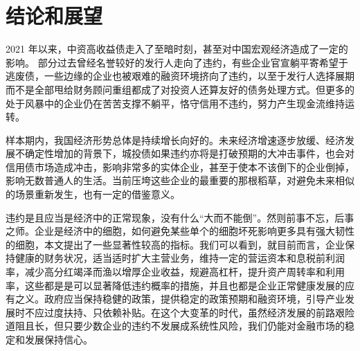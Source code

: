 \chapter{结论和展望}

2021 年以来，中资高收益债走入了至暗时刻，甚至对中国宏观经济造成了一定的影响。
部分过去曾经名誉较好的发行人走向了违约，有些企业官宣躺平寄希望于逃废债，一些边缘的企业也被艰难的融资环境挤向了违约，以至于发行人选择展期而不是全部甩给财务顾问重组都成了对投资人还算友好的债务处理方式。但更多的处于风暴中的企业仍在苦苦支撑不躺平，恪守信用不违约，努力产生现金流维持运转。

样本期内，我国经济形势总体是持续增长向好的。未来经济增速逐步放缓、经济发展不确定性增加的背景下，城投债如果违约亦将是打破预期的大冲击事件，也会对信用债市场造成冲击，影响非常多的实体企业，甚至于使本不该倒下的企业倒掉，影响无数普通人的生活。当前压垮这些企业的最重要的那根稻草，对避免未来相似的场景重新发生，也有一定的借鉴意义。

违约是且应当是经济中的正常现象，没有什么“大而不能倒”。然则前事不忘，后事之师。企业是经济中的细胞，如何避免某些单个的细胞坏死影响更多具有强大韧性的细胞，本文提出了一些显著性较高的指标。我们可以看到，就目前而言，企业保持健康的财务状况，适当适时扩大主营业务，维持一定的营运资本和息税前利润率，减少高分红竭泽而渔以增厚企业收益，规避高杠杆，提升资产周转率和利用率，这些都是是可以显著降低违约概率的措施，并且也都是企业正常健康发展的应有之义。政府应当保持稳健的政策，提供稳定的政策预期和融资环境，引导产业发展时不应过度扶持、只依赖补贴。在这个大变革的时代，虽然经济发展的前路艰险道阻且长，但只要少数企业的违约不发展成系统性风险，我们仍能对金融市场的稳定和发展保持信心。
